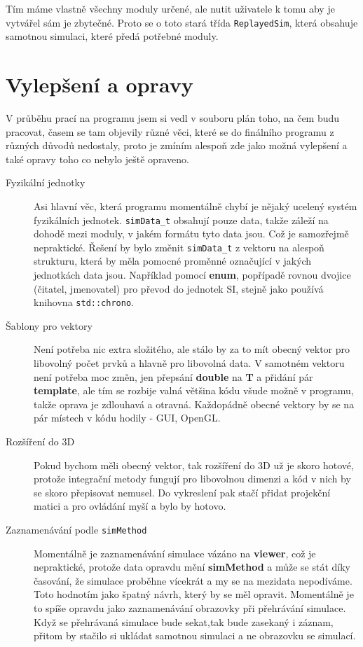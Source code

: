 Tím máme vlastně všechny moduly určené, ale nutit uživatele k tomu aby je vytvářel sám je zbytečné. Proto se o toto stará třída \texttt{ReplayedSim}, která obsahuje samotnou simulaci, které předá potřebné moduly.
\section{Vylepšení a opravy}
\label{sec:vylepseni}
V průběhu prací na programu jsem si vedl v souboru plán toho, na čem budu pracovat, časem se tam objevily různé věci, které se do finálního programu z různých důvodů nedostaly, proto je zmíním alespoň zde jako možná vylepšení a také opravy toho co nebylo ještě opraveno.

\begin{description}
	\item[Fyzikální jednotky] Asi hlavní věc, která programu momentálně chybí je nějaký ucelený systém fyzikálních jednotek. \texttt{simData\_t} obsahují pouze data, takže záleží na dohodě mezi moduly, v jakém formátu tyto data jsou. Což je samozřejmě nepraktické. Řešení by bylo změnit \texttt{simData\_t} z vektoru na alespoň strukturu, která by měla pomocné proměnné označující v jakých jednotkách data jsou. Například pomocí \textbf{enum}, popřípadě rovnou dvojice (čitatel, jmenovatel) pro převod do jednotek SI, stejně jako používá knihovna \texttt{std::chrono}.
	
	\item[Šablony pro vektory] Není potřeba nic extra složitého, ale stálo by za to mít obecný vektor pro libovolný počet prvků a hlavně pro libovolná data. V samotném vektoru není potřeba moc změn, jen přepsání \textbf{double} na \textbf{T} a přidání pár \textbf{template}, ale tím se rozbije valná většina kódu všude možně v programu, takže oprava je zdlouhavá a otravná.
	Každopádně obecné vektory by se na pár místech v kódu hodily - GUI, OpenGL.
	
	\item[Rozšíření do 3D] Pokud bychom měli obecný vektor, tak rozšíření do 3D už je skoro hotové, protože integrační metody fungují pro libovolnou dimenzi a kód v nich by se skoro přepisovat nemusel. Do vykreslení pak stačí přidat projekční matici a  pro ovládání myší a bylo by hotovo.
	
	\item[Zaznamenávání podle \texttt{simMethod}] Momentálně je zaznamenávání simulace vázáno na \textbf{viewer}, což je nepraktické, protože data opravdu mění \textbf{simMethod} a může se stát díky časování, že simulace proběhne vícekrát a my se na mezidata nepodíváme. Toto hodnotím jako špatný návrh, který by se měl opravit. Momentálně je to spíše opravdu jako zaznamenávání obrazovky při přehrávání simulace. Když se přehrávaná simulace bude sekat,tak bude zasekaný i záznam, přitom by stačilo si ukládat samotnou simulaci a ne obrazovku se simulací.
	

\end{description}
